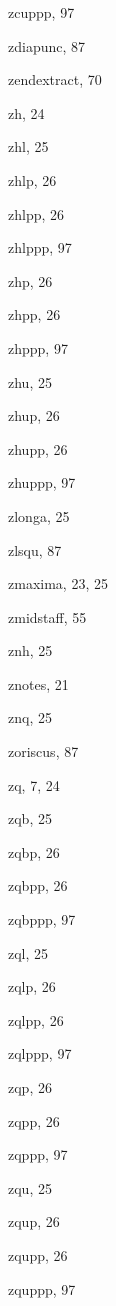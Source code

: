 \begin{theindex}
  \item {\Bslash zcuppp}, 97
  \item {\Bslash zdiapunc}, 87
  \item {\Bslash zendextract}, 70
  \item {\Bslash zh}, 24
  \item {\Bslash zhl}, 25
  \item {\Bslash zhlp}, 26
  \item {\Bslash zhlpp}, 26
  \item {\Bslash zhlppp}, 97
  \item {\Bslash zhp}, 26
  \item {\Bslash zhpp}, 26
  \item {\Bslash zhppp}, 97
  \item {\Bslash zhu}, 25
  \item {\Bslash zhup}, 26
  \item {\Bslash zhupp}, 26
  \item {\Bslash zhuppp}, 97
  \item {\Bslash zlonga}, 25
  \item {\Bslash zlsqu}, 87
  \item {\Bslash zmaxima}, 23, 25
  \item {\Bslash zmidstaff}, 55
  \item {\Bslash znh}, 25
  \item {\Bslash znotes}, 21
  \item {\Bslash znq}, 25
  \item {\Bslash zoriscus}, 87
  \item {\Bslash zq}, 7, 24
  \item {\Bslash zqb}, 25
  \item {\Bslash zqbp}, 26
  \item {\Bslash zqbpp}, 26
  \item {\Bslash zqbppp}, 97
  \item {\Bslash zql}, 25
  \item {\Bslash zqlp}, 26
  \item {\Bslash zqlpp}, 26
  \item {\Bslash zqlppp}, 97
  \item {\Bslash zqp}, 26
  \item {\Bslash zqpp}, 26
  \item {\Bslash zqppp}, 97
  \item {\Bslash zqu}, 25
  \item {\Bslash zqup}, 26
  \item {\Bslash zqupp}, 26
  \item {\Bslash zquppp}, 97

\end{theindex}
